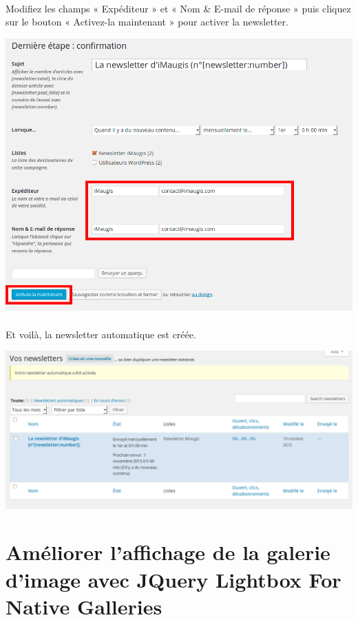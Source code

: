 \documentclass[10pt,a4paper]{article}
\begin{document}
\paragraph{}Modifiez les champs « Expéditeur » et « Nom \& E-mail de réponse » puis cliquez sur le bouton « Activez-la maintenant » pour activer la newsletter.
\begin{center}
\includegraphics[scale=0.3]{img/0232.png}
\end{center}
\paragraph{}Et voilà, la newsletter automatique est créée.
\begin{center}
\includegraphics[scale=0.3]{img/0233.png}
\end{center}
\section{Améliorer l'affichage de la galerie d'image avec JQuery Lightbox For Native Galleries}
\end{document}
